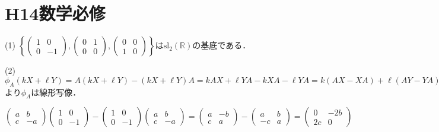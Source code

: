 \documentclass[
		book,
		head_space=20mm,
		foot_space=20mm,
		gutter=10mm,
		line_length=190mm
]{jlreq}
\begin{document}
\section{H14数学必修}
(1) $\left\{ \begin{pmatrix}
    1 & 0 \\
    0 & -1
\end{pmatrix},\begin{pmatrix}
    0 & 1 \\
    0 & 0
\end{pmatrix},\begin{pmatrix}
    0 & 0 \\
    1 & 0
    \end{pmatrix} \right\}$は$\mathrm{sl}_2(\mathbb{R})$の基底である．


(2) $\phi_A(kX+\ell Y)=A(kX+\ell Y)-(kX+\ell Y)A=kAX+\ell YA-kXA-\ell YA=k(AX-XA)+\ell(AY-YA)=k\phi_A(X)+\ell\phi_A(Y)$より$\phi_A$は線形写像．

$\begin{pmatrix}
    a & b \\
    c & -a 
\end{pmatrix}\begin{pmatrix}
    1 & 0 \\
    0 & -1
\end{pmatrix}-\begin{pmatrix}
    1 & 0 \\
    0 & -1
\end{pmatrix}\begin{pmatrix}
    a & b \\
    c & -a
\end{pmatrix}=\begin{pmatrix}
    a & -b \\
    c & a
\end{pmatrix}-\begin{pmatrix}
    a & b \\
    -c & a
\end{pmatrix}=\begin{pmatrix}
    0 & -2b \\
    2c & 0
\end{pmatrix}$
\end{document}
